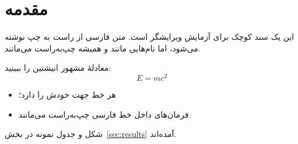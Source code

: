 \section{مقدمه}\label{sec:intro}
این یک سند کوچک برای آزمایش ویرایشگر است. متن فارسی از راست به چپ نوشته می‌شود،
اما نام‌هایی مانند  و  همیشه چپ‌به‌راست می‌مانند.

معادلهٔ مشهور انیشتین  را ببینید:
\begin{equation}
  E = mc^2
\end{equation}

\begin{itemize}
  \item هر خط جهت خودش را دارد؛
  \item فرمان‌های  داخل خط فارسی چپ‌به‌راست می‌مانند.
\end{itemize}

شکل و جدول نمونه در بخش~\ref{sec:results} آمده‌اند.
